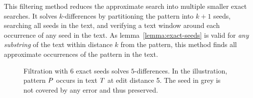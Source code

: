 This filtering method reduces the approximate search into multiple smaller exact searches.
It solves $k$-differences by partitioning the pattern into $k+1$ seeds, searching all seeds in the text, and verifying a text window around each occurrence of any seed in the text.
As lemma~\ref{lemma:exact-seeds} is valid for \emph{any substring} of the text within distance $k$ from the pattern, this method finds all approximate occurrences of the pattern in the text.

\begin{figure}[b]
\begin{center}
\caption[Filtration with exact seeds]{Filtration with 6 exact seeds solves $5$-differences. In the illustration, pattern $P$ occurs in text $T$ at edit distance 5. The seed in grey is not covered by any error and thus preserved.}
\label{fig:seeds-ext}

\end{center}
\end{figure}


